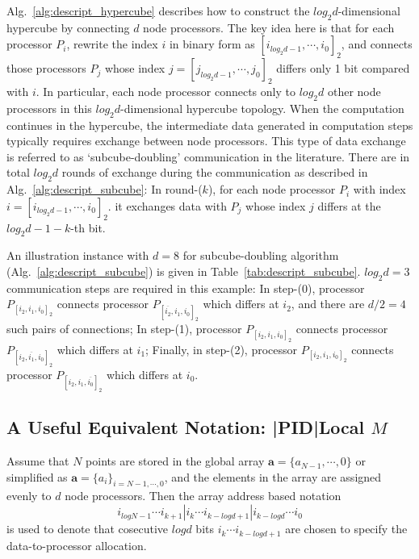 \documentclass[submission]{iacrtrans}
\theoremstyle{plain}
\begin{document}
Alg.~\ref{alg:descript_hypercube} describes how to construct the $log_2d$-dimensional hypercube by connecting $d$ node processors. The key idea here is that for each processor $P_i$, rewrite the index $i$ in binary form as $[i_{log_2d-1},\cdots,i_0]_2$, and connects those processors $P_j$ whose index $j=[j_{log_2d-1},\cdots,j_0]_2$ differs only 1 bit compared with $i$. In particular, each node processor connects only to $log_2d$ other node processors in this $log_2d$-dimensional hypercube topology.
{}
When the computation continues in the hypercube, the intermediate data generated in computation steps typically requires exchange between node processors. This type of data exchange is referred to as `subcube-doubling' communication in the literature. There are in total $log_2d$ rounds of exchange during the communication as described in Alg.~\ref{alg:descript_subcube}: In round-($k$), for each node processor $P_i$ with index $i=[i_{log_2d-1},\cdots,i_{0}]_2$. it exchanges data with $P_j$ whose index $j$ differs at the $log_2d-1-k$-th bit. 

An illustration instance with $d=8$ for subcube-doubling algorithm (Alg.~\ref{alg:descript_subcube}) is given in Table~\ref{tab:descript_subcube}. $log_2d=3$ communication steps are required in this example: In step-(0), processor $P_{[i_{2},i_{1},i_{0}]_2}$ connects processor $P_{[\overline{i_{2}},i_{1},i_{0}]_2}$ which differs at $i_{2}$, and there are $d/2=4$ such pairs of connections; In step-(1), processor $P_{[i_{2},i_{1},i_{0}]_2}$ connects processor $P_{[i_{2},\overline{i_{1}},i_{0}]_2}$ which differs at $i_{1}$; Finally, in step-(2), processor $P_{[i_{2},i_{1},i_{0}]_2}$ connects processor $P_{[i_{2},i_{1},\overline{i_{0}}]_2}$ which differs at $i_{0}$.


\subsection{A Useful Equivalent Notation: |PID|Local $M$}
Assume that $N$ points are stored in the global array $\mathbf{a}=\{a_{N-1},\cdots,0\}$ or simplified as $\mathbf{a}=\{a_i\}_{i=N-1,\cdots,0}$, and the elements in the array are assigned evenly to $d$ node processors. Then the array address based notation
\[
  i_{logN-1}\cdots i_{k+1}|i_k\cdots i_{k-logd+1}|i_{k-logd}\cdots i_0
\]
is used to denote that cosecutive $logd$ bits $i_k\cdots i_{k-logd+1}$ are chosen to specify the data-to-processor allocation.
\end{document}
